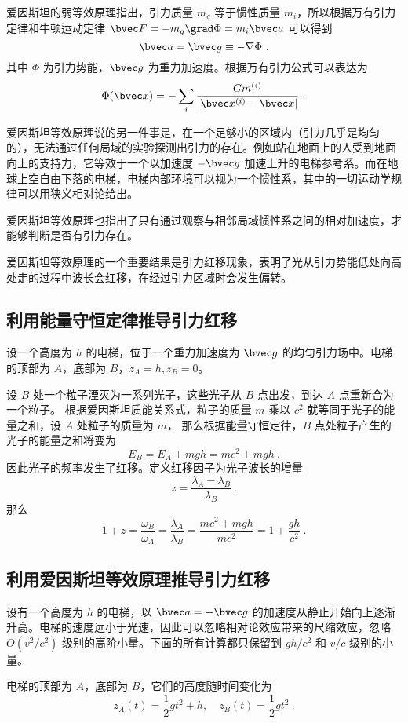 

爱因斯坦的弱等效原理指出，引力质量 $m_g$ 等于惯性质量 $m_i$，所以根据万有引力定律和牛顿运动定律 $\bvec F=-m_g \grad \Phi = m_i \bvec a$ 可以得到 
\begin{equation}
\bvec a=\bvec g \equiv -\nabla\Phi~.
\end{equation}
其中 $\Phi$ 为引力势能，$\bvec g$ 为重力加速度。根据万有引力公式可以表达为
\begin{equation}
\Phi(\bvec x)=-\sum_{i} \frac{G m^{(i)}}{|\bvec x^{(i)}-\bvec x|}~.
\end{equation}

爱因斯坦等效原理说的另一件事是，在一个足够小的区域内（引力几乎是均匀的），无法通过任何局域的实验探测出引力的存在。例如站在地面上的人受到地面向上的支持力，它等效于一个以加速度 $-\bvec g$ 加速上升的电梯参考系。而在地球上空自由下落的电梯，电梯内部环境可以视为一个惯性系，其中的一切运动学规律可以用狭义相对论给出。

爱因斯坦等效原理也指出了只有通过观察与相邻局域惯性系之问的相对加速度，才能够判断是否有引力存在。

爱因斯坦等效原理的一个重要结果是引力红移现象，表明了光从引力势能低处向高处走的过程中波长会红移，在经过引力区域时会发生偏转。
\subsection{利用能量守恒定律推导引力红移}
设一个高度为 $h$ 的电梯，位于一个重力加速度为 $\bvec g$ 的均匀引力场中。电梯的顶部为 $A$，底部为 $B$，$z_A=h,z_B=0$。

设 $B$ 处一个粒子湮灭为一系列光子，这些光子从 $B$ 点出发，到达 $A$ 点重新合为一个粒子。
根据爱因斯坦质能关系式，粒子的质量 $m$ 乘以 $c^2$ 就等同于光子的能量之和，设 $A$ 处粒子的质量为 $m$，
那么根据能量守恒定律，$B$ 点处粒子产生的光子的能量之和将变为
\begin{equation}
E_B=E_A+mgh = mc^2+mgh~.
\end{equation}
因此光子的频率发生了红移。定义红移因子为光子波长的增量
\begin{equation}
z = \frac{\lambda_A-\lambda_B}{\lambda_B}~.
\end{equation}
那么
\begin{equation}
1+z=\frac{\omega_B}{\omega_A} = \frac{\lambda_A}{\lambda_B} = \frac{mc^2+mgh}{mc^2} = 1+\frac{gh}{c^2}~.
\end{equation}

\subsection{利用爱因斯坦等效原理推导引力红移}
设有一个高度为 $h$ 的电梯，以 $\bvec a=-\bvec g$ 的加速度从静止开始向上逐渐升高。电梯的速度远小于光速，因此可以忽略相对论效应带来的尺缩效应，忽略 $O(v^2/c^2)$ 级别的高阶小量。下面的所有计算都只保留到 $gh/c^2$ 和 $v/c$ 级别的小量。

电梯的顶部为 $A$，底部为 $B$，它们的高度随时间变化为
\begin{equation}
z_A(t)=\frac{1}{2}gt^2+h,\quad z_B(t)=\frac{1}{2}gt^2~.
\end{equation}

